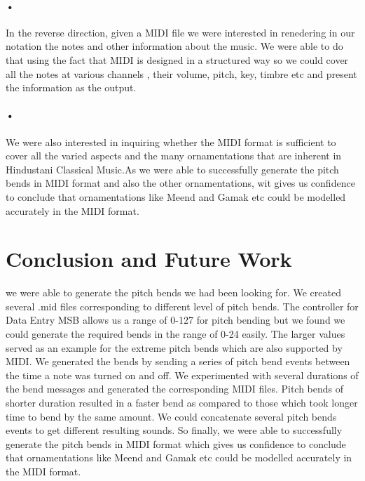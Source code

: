 \documentclass[12pt,a4paper]{article}
\begin{document}
\paragraph{•}
In the reverse direction, given a MIDI file we were interested in renedering in our notation the notes and other information about the music. We were able to do that using the fact that MIDI is designed in a structured way so we could cover all the notes at various channels , their volume, pitch, key, timbre etc and present the information as the output. 
\paragraph{•}
We were also interested in inquiring whether the MIDI format is sufficient to cover all the varied aspects and the many ornamentations that are inherent in Hindustani Classical Music.As we were able to successfully generate the pitch bends in MIDI format and also the other ornamentations, wit gives us confidence to conclude that ornamentations like Meend and Gamak etc could be modelled accurately in the MIDI format.




\pagebreak

\section{Conclusion and Future Work}
we were able to generate the pitch bends we had been looking for. We created several .mid files corresponding to different level of pitch bends. The controller for Data Entry MSB allows us a range of 0-127 for pitch bending but we found we could generate the required bends in the range of 0-24 easily. The larger values served as an example for the extreme pitch bends which are also supported by MIDI. We generated the bends by sending a series of pitch bend events between the time a note was turned on and off. We experimented with several durations of the bend messages and generated the corresponding MIDI files. Pitch bends of shorter duration resulted in a faster bend as compared to those which took  longer time to bend by the same amount. We could concatenate several pitch bends events to get different resulting sounds. So finally, we were able to successfully generate the pitch bends in MIDI format which gives us confidence to conclude that ornamentations like Meend and Gamak etc could be modelled accurately in the MIDI format.
\end{document}
